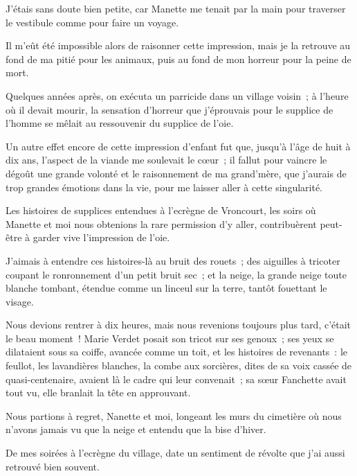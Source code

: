 \documentclass[french,twoside]{book} %
\begin{document}
J’étais sans doute bien petite, car Manette me tenait par la main pour traverser le vestibule comme pour faire un voyage.\par
Il m’eût été impossible alors de raisonner cette impression, mais je la retrouve au fond de ma pitié pour les animaux, puis au fond de mon horreur pour la peine de mort.\par
 Quelques années après, on exécuta un parricide dans un village voisin ; à l’heure où il devait mourir, la sensation d’horreur que j’éprouvais pour le supplice de l’homme se mêlait au ressouvenir du supplice de l’oie.\par
Un autre effet encore de cette impression d’enfant fut que, jusqu’à l’âge de huit à dix ans, l’aspect de la viande me soulevait le cœur ; il fallut pour vaincre le dégoût une grande volonté et le raisonnement de ma grand’mère, que j’aurais de trop grandes émotions dans la vie, pour me laisser aller à cette singularité.\par
Les histoires de supplices entendues à l’ecrègne de Vroncourt, les soirs où Manette et moi nous obtenions la rare permission d’y aller, contribuèrent peut-être à garder vive l’impression de l’oie.\par
J’aimais à entendre ces histoires-là au bruit des rouets ; des aiguilles à tricoter coupant le ronronnement d’un petit bruit sec ; et la neige, la grande neige toute blanche tombant, étendue comme un linceul sur la terre, tantôt fouettant le visage.\par
Nous devions rentrer à dix heures, mais nous revenions toujours plus tard, c’était le beau moment ! Marie Verdet posait son tricot sur ses genoux ; ses yeux se dilataient sous sa coiffe,  avancée comme un toit, et les histoires de revenants : le feullot, les lavandières blanches, la combe aux sorcières, dites de sa voix cassée de quasi-centenaire, avaient là le cadre qui leur convenait ; sa sœur Fanchette avait tout vu, elle branlait la tête en approuvant.\par
Nous partions à regret, Nanette et moi, longeant les murs du cimetière où nous n’avons jamais vu que la neige et entendu que la bise d’hiver.\par
De mes soirées à l’ecrègne du village, date un sentiment de révolte que j’ai aussi retrouvé bien souvent.\par
\end{document}
